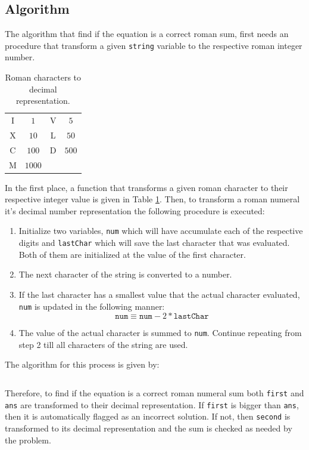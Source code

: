 \documentclass[11pt]{article}
\theoremstyle{definition}
\theoremstyle{remark}
\theoremstyle{remark}
\newcommand{\code}[2]{\inputminted[frame=lines, linenos, firstline=#1,
  lastline=#2]{cpp}{../src/roman-numerals.cpp}}
\begin{document}
\subsection{Algorithm}
The algorithm that find if the equation is a correct roman sum, first needs an
procedure that transform a given \texttt{string} variable to the respective
roman integer number.
%
\begin{table}
  \centering
  \begin{tabular}{cccc}
  \hline
  I   &   $1$ & V &$5$ \\
  X   &  $10$  & L & $50$ \\
  C   & $100$ & D &  $500$  \\
  M  & $1000$  & \\
  \hline
  \end{tabular}
  \caption{Roman characters to decimal representation.}
  \label{tab:romChar}
\end{table}
%
In the first place, a function that transforms a given roman character to their
respective integer value is given in Table \ref{tab:romChar}. Then, to transform
a roman numeral it's decimal number representation the following procedure is
executed:
%
\begin{enumerate}
  \item Initialize two variables, \texttt{num} which will have accumulate each
    of the respective digits and \texttt{lastChar} which will save the last
    character that was evaluated. Both of them are initialized at the value of
    the first character.
  \item The next character of the string is converted to a number.
  \item If the last character has a smallest value that the actual character
    evaluated, \texttt{num} is updated in the following manner:
    \begin{equation*}
      \mathtt{num} \equiv \mathtt{num} - 2*\mathtt{lastChar}
    \end{equation*}
  \item The value of the actual character is summed to \texttt{num}. Continue
    repeating from step 2 till all characters of the string are used.
\end{enumerate}
%
The algorithm for this process is given by: \code{105}{116}
%
Therefore, to find if the equation is a correct roman numeral sum both
\texttt{first} and \texttt{ans} are transformed to their decimal representation.
If \texttt{first} is bigger than \texttt{ans}, then it is automatically flagged
as an incorrect solution. If not, then \texttt{second} is transformed to its
decimal representation and the sum is checked as needed by the problem.
\end{document}
